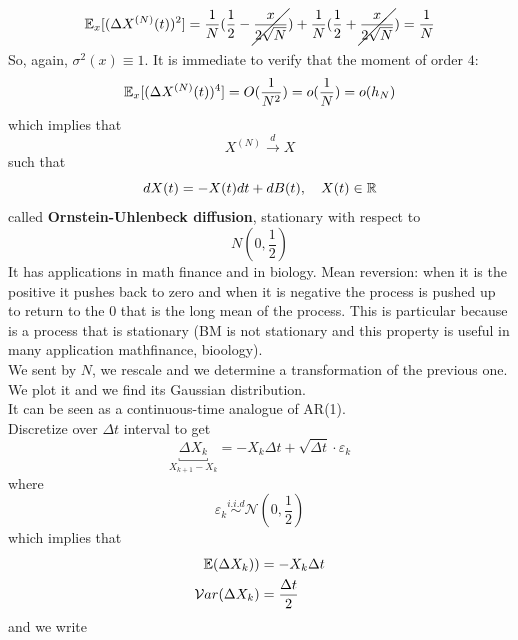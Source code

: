 \documentclass{article}
\begin{document}
\begin{enumerate}
\begin{align*}
	\end{align*}
	\begin{equation*}
		\mathbb{E}_x[(\Delta X^{(N)}(t))^2] = \frac{1}{N}(\frac{1}{2}-{\cancel{\frac{x}{2\sqrt{N}}}}) + \frac{1}{N}(\frac{1}{2}+{\cancel{\frac{x}{2\sqrt{N}}}}) = \frac{1}{N}
	\end{equation*}
	So, again, $\sigma^2(x) \equiv 1$.
	It is immediate to verify that the moment of order $4$:
	\begin{equation*}
		\mathbb{E}_x[(\Delta X^{(N)}(t))^4] =O(\frac{1}{N^2})= o (\frac{1}{N})= o (h_N)
	\end{equation*}
	which implies that 
	\begin{equation*}
		X^{(N)} \xrightarrow{d} X
	\end{equation*}
	such that 
	\begin{equation*}
		d X(t) = - X(t) dt + d B(t), \quad X(t) \in \mathbb{R}
	\end{equation*}
	called \textbf{Ornstein-Uhlenbeck diffusion}, stationary with respect to 
	\begin{equation*}
		N(0,\frac{1}{2})
	\end{equation*}
	It has applications in math finance and in biology. 
	Mean reversion: when it is the positive it pushes back to zero and when it is negative the process is pushed up to return to the $0$ that is the long mean of the process.
	This is particular because is a process that is stationary (BM is not stationary and this property is useful in many application mathfinance, bioology). \\
	We sent by $N$, we rescale and we determine a transformation of the previous one. We plot it and we find its Gaussian distribution. \\
	It can be seen as a continuous-time analogue of AR(1).\\
	Discretize over $\Delta t$ interval to get 
	\begin{equation*}
		\underbracket{\Delta  X_k}_{X_{k+1}-X_{k}} = - X_k \Delta t + \sqrt{\Delta t} \cdot\varepsilon_k 
	\end{equation*}
	where 
	\begin{equation*}
		\varepsilon_k \stackrel{i.i.d}{\sim}
		\mathcal{N}(0,\frac{1}{2})
	\end{equation*}
	which implies that 
	\begin{align*}
		\mathbb{E}(\Delta X_k) ) & = - X_k \Delta t \\
		\mathcal{V} ar(\Delta X_k) &= \frac{\Delta t}{2}
	\end{align*}
	and we write
	\begin{equation*}

\end{equation*}
\end{enumerate}
\end{document}
